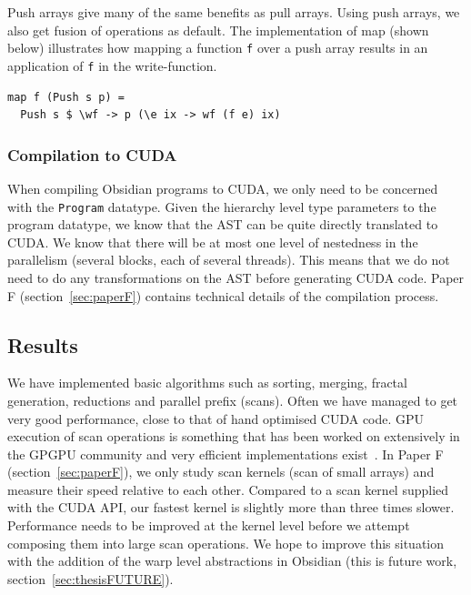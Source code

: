 \documentclass[a4paper]{book}
\begin{document}
Push arrays give many of the same benefits as pull arrays. Using push 
arrays, we also get fusion of operations as default. The implementation of map 
(shown below) illustrates how mapping a function {\tt f} over a push array results 
in an application of {\tt f} in the write-function. 

\begin{verbatim} 
map f (Push s p) = 
  Push s $ \wf -> p (\e ix -> wf (f e) ix)
\end{verbatim}

\subsubsection{Compilation to CUDA}

When compiling Obsidian programs to CUDA, we only need to be concerned with the 
{\tt Program} datatype. Given the hierarchy level type parameters to the program datatype, 
we know that the AST can be quite directly translated to CUDA. We know that there will 
be at most one level of nestedness in the parallelism (several blocks, each of several threads). 
This means that we do not need to do any transformations on the AST before generating CUDA code. 
Paper F (section~\ref{sec:paperF}) contains technical details of the compilation process. 

\subsection{Results}
\FloatBarrier 

We have implemented basic algorithms such as sorting, merging, fractal generation, reductions 
and parallel prefix (scans). Often we have managed to get very good performance, close to that 
of hand optimised CUDA code. GPU execution of scan operations is something that has 
been worked on extensively in the GPGPU community and very efficient implementations 
exist~\citet{merrill,ScanCUDA,OLAMARCUS,EFFICIENTSCAN}. In Paper F (section~\ref{sec:paperF}), 
we only study scan kernels (scan of small arrays) and measure their speed relative to each other. 
Compared to a scan kernel supplied with the CUDA API, our fastest kernel is slightly more 
than three times slower. Performance needs to be improved at the kernel level before we attempt 
composing them into large scan operations. We hope to improve this situation with the 
addition of the warp level abstractions in Obsidian (this is future work, 
section~\ref{sec:thesisFUTURE}). 
\end{document}
